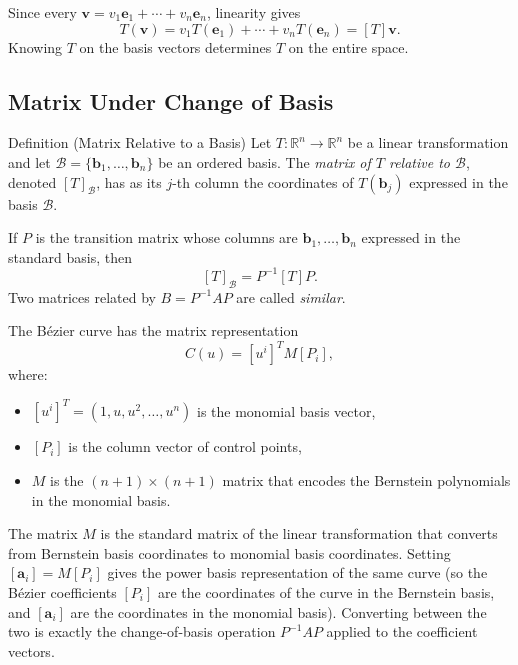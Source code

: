 \begin{remark*}
Since every $\mathbf{v} = v_1\mathbf{e}_1 + \cdots + v_n\mathbf{e}_n$,
linearity gives
\[
  T(\mathbf{v}) = v_1 T(\mathbf{e}_1) + \cdots + v_n T(\mathbf{e}_n) = [T]\mathbf{v}.
\]
Knowing $T$ on the basis vectors determines $T$ on the entire space.
\end{remark*}

\subsection*{Matrix Under Change of Basis}

\begin{propositionbox}{Definition (Matrix Relative to a Basis)}
Let $T : \mathbb{R}^n \to \mathbb{R}^n$ be a linear transformation and let
$\mathcal{B} = \{\mathbf{b}_1, \ldots, \mathbf{b}_n\}$ be an ordered basis.
The \emph{matrix of $T$ relative to $\mathcal{B}$}, denoted $[T]_\mathcal{B}$,
has as its $j$-th column the coordinates of $T(\mathbf{b}_j)$ expressed in the
basis $\mathcal{B}$.

If $P$ is the transition matrix whose columns are $\mathbf{b}_1, \ldots, \mathbf{b}_n$
expressed in the standard basis, then
\[
  [T]_\mathcal{B} = P^{-1} [T] P.
\]
Two matrices related by $B = P^{-1}AP$ are called \emph{similar}.
\end{propositionbox}

\begin{remark*}
The Bézier curve has the matrix representation
\[
  C(u) = [u^i]^T M [P_i],
\]
where:
\begin{itemize}
  \item $[u^i]^T = (1, u, u^2, \ldots, u^n)$ is the monomial basis vector,
  \item $[P_i]$ is the column vector of control points,
  \item $M$ is the $(n+1)\times(n+1)$ matrix that encodes the Bernstein polynomials
        in the monomial basis.
\end{itemize}
The matrix $M$ is the standard matrix of the linear transformation
that converts from Bernstein basis coordinates to monomial basis coordinates.
Setting $[\mathbf{a}_i] = M[P_i]$ gives the power basis representation of the
same curve (so the Bézier coefficients $[P_i]$ are the coordinates of the
curve in the Bernstein basis, and $[\mathbf{a}_i]$ are the coordinates in the
monomial basis).
Converting between the two is exactly the change-of-basis operation $P^{-1}AP$
applied to the coefficient vectors.
\end{remark*}
